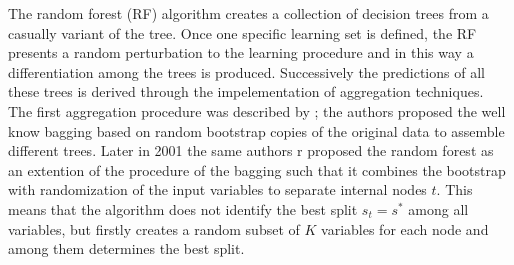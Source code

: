 \documentclass[a4,12pt]{article}
\begin{document}





The random forest (RF) algorithm creates a collection of decision trees from a casually variant of the tree. Once one specific learning set is defined, the RF presents a random perturbation to the learning procedure and in this way a differentiation among the trees is produced. Successively the predictions of all these trees is derived through the impelementation of aggregation techniques. The first aggregation procedure was described by \cite{Breiman96}; the authors proposed the well know bagging based on random bootstrap copies of the original data to assemble different trees. Later in 2001 the same authors \cite{Breiman01}r proposed the random forest as an extention of the procedure of the bagging such that it combines the bootstrap with randomization of the input variables to separate internal nodes $t$. This means that the algorithm does not identify the best split $s_{t}=s^{*}$ among all variables, but firstly creates a random subset of $K$ variables for each node and among them determines the best split.
\end{document}
